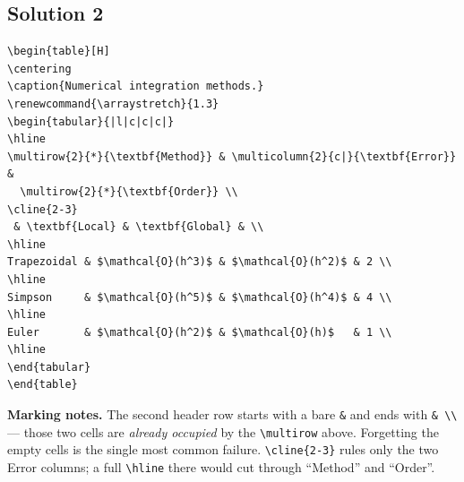 \documentclass[11pt]{article}
\begin{document}
\subsection*{Solution 2}
\begin{lstlisting}[style=tex]
\begin{table}[H]
\centering
\caption{Numerical integration methods.}
\renewcommand{\arraystretch}{1.3}
\begin{tabular}{|l|c|c|c|}
\hline
\multirow{2}{*}{\textbf{Method}} & \multicolumn{2}{c|}{\textbf{Error}} &
  \multirow{2}{*}{\textbf{Order}} \\
\cline{2-3}
 & \textbf{Local} & \textbf{Global} & \\
\hline
Trapezoidal & $\mathcal{O}(h^3)$ & $\mathcal{O}(h^2)$ & 2 \\
\hline
Simpson     & $\mathcal{O}(h^5)$ & $\mathcal{O}(h^4)$ & 4 \\
\hline
Euler       & $\mathcal{O}(h^2)$ & $\mathcal{O}(h)$   & 1 \\
\hline
\end{tabular}
\end{table}
\end{lstlisting}
\textbf{Marking notes.} The second header row starts with a bare \verb|&| and
ends with \verb|& \\| --- those two cells are \emph{already occupied} by the
\verb|\multirow| above. Forgetting the empty cells is the single most common
failure. \verb|\cline{2-3}| rules only the two Error columns; a full
\verb|\hline| there would cut through ``Method'' and ``Order''.

\end{document}
